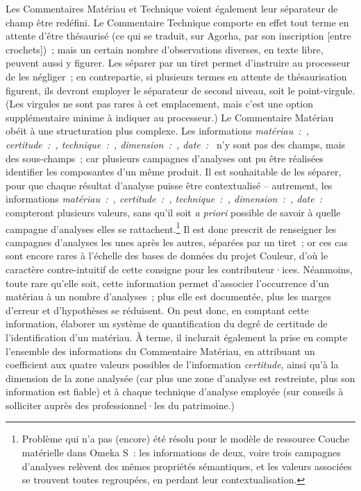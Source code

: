 \documentclass[a4paper,12pt, twoside]{book}
\begin{document}
Les \textsf{Commentaires Matériau} et \textsf{Technique} voient également leur séparateur de champ être redéfini. Le \textsf{Commentaire Technique} comporte en effet tout terme en attente d’être thésaurisé (ce qui se traduit, sur Agorha, par son inscription [entre crochets])~; mais un certain nombre d’observations diverses, en texte libre, peuvent aussi y figurer. Les séparer par un tiret permet d’instruire au processeur de les négliger~; en contrepartie, si plusieurs termes en attente de thésaurisation figurent, ils devront employer le séparateur de second niveau, soit le point-virgule. (Les virgules ne sont pas rares à cet emplacement, mais c’est une option supplémentaire minime à indiquer au processeur.) Le \textsf{Commentaire Matériau} obéit à une structuration plus complexe. Les informations \textit{\textsf{matériau~:~, certitude~:~, technique~:~, dimension~:~, date~:~}} n’y sont pas des champs, mais des sous-champs~; car plusieurs campagnes d’analyses ont pu être réalisées identifier les composantes d’un même produit. Il est souhaitable de les séparer, pour que chaque résultat d’analyse puisse être contextualisé – autrement, les informations \textit{\textsf{matériau~:~, certitude~:~, technique~:~, dimension~:~, date~:}} compteront plusieurs valeurs, sans qu’il soit \textit{a priori} possible de savoir à quelle campagne d’analyses elles se rattachent.\footnote{Problème qui n’a pas (encore) été résolu pour le modèle de ressource \textsf{Couche matérielle} dans Omeka S~: les informations de deux, voire trois campagnes d’analyses relèvent des mêmes propriétés sémantiques, et les valeurs associées se trouvent toutes regroupées, en perdant leur contextualisation.} Il est donc prescrit de renseigner les campagnes d’analyses les unes après les autres, séparées par un tiret~; or ces cas sont encore rares à l’échelle des bases de données du projet Couleur, d’où le caractère contre-intuitif de cette consigne pour les contributeur·ices. Néanmoins, toute rare qu’elle soit, cette information permet d’associer l’occurrence d’un matériau à un nombre d’analyses~; plus elle est documentée, plus les marges d’erreur et d’hypothèses se réduisent. On peut donc, en comptant cette information, élaborer un système de quantification du degré de certitude de l’identification d’un matériau. À terme, il inclurait également la prise en compte l’ensemble des informations du \textsf{Commentaire Matériau}, en attribuant un coefficient aux quatre valeurs possibles de l’information \textit{\textsf{certitude}}, ainsi qu’à la dimension de la zone analysée (car plus une zone d’analyse est restreinte, plus son information est fiable) et à chaque technique d’analyse employée (sur conseils à solliciter auprès des professionnel·les du patrimoine.)
\end{document}
